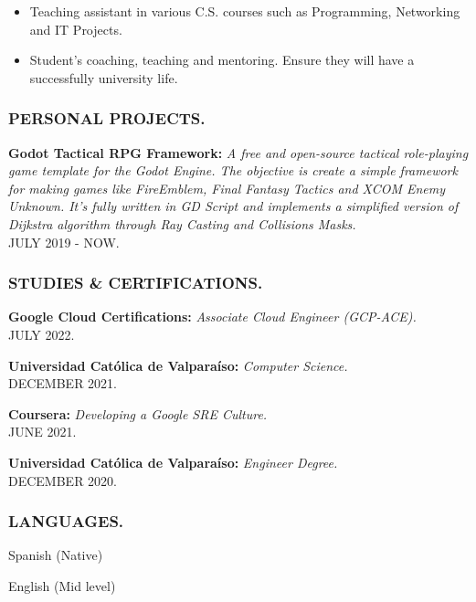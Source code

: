 \documentclass[11pt]{article}
\begin{document}
\begin{itemize}
    \item[1.] Teaching assistant in various C.S. courses such as Programming, Networking and IT Projects. 
    \item[2.] Student's coaching, teaching and mentoring. Ensure they will have a successfully university life.
\end{itemize}

\newpage
\thispagestyle{empty}
\subsubsection*{PERSONAL PROJECTS.}

\textbf{Godot Tactical RPG Framework:} \textit{A free and open-source tactical role-playing game template for the Godot Engine. The objective is create a simple framework for making games like FireEmblem, Final Fantasy Tactics and XCOM Enemy Unknown. It's fully written in GD Script and implements a simplified version of Dijkstra algorithm through Ray Casting and Collisions Masks.}\\
{\footnotesize JULY 2019 - NOW.}


\subsubsection*{STUDIES \& CERTIFICATIONS.}


\noindent
\textbf{Google Cloud Certifications:} \textit{Associate Cloud Engineer (GCP-ACE).}\\
{\footnotesize JULY 2022.}

\vspace{3mm}

\noindent
\textbf{Universidad Católica de Valparaíso:} \textit{Computer Science.}\\
{\footnotesize DECEMBER 2021.}

\vspace{3mm}

\noindent
\textbf{Coursera:} \textit{Developing a Google SRE Culture.}\\
{\footnotesize JUNE 2021.}

\vspace{3mm}

\noindent
\textbf{Universidad Católica de Valparaíso:} \textit{Engineer Degree.}\\
{\footnotesize DECEMBER 2020.}


\subsubsection*{LANGUAGES.}

\noindent 
Spanish (Native)

\vspace{3mm}

\noindent 
English (Mid level)
\end{document}
